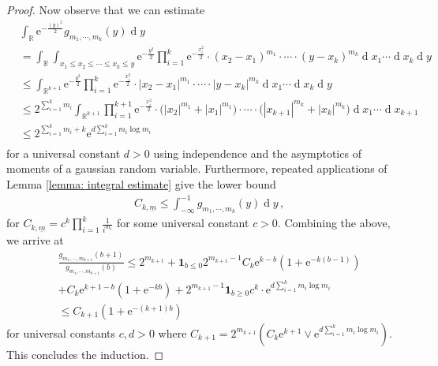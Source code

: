\documentclass[11pt, reqno]{amsart}
\numberwithin{equation}{section}
\newcommand{\R}{\ensuremath{\mathbb{R}}}
\newcommand{\diff}{\ensuremath{\operatorname{d}\!}}
\begin{document}
\begin{proof}
    Now observe that we can estimate
    \begin{equation*}
    \begin{array}{cc}
        &\displaystyle\int_{\R}\mathrm{e}^{-\frac{(y)^2}{2}} g_{m_1, \cdots, m_{k}}(y)\diff y\\
        & = \displaystyle \int_{\R}\int_{x_1\le x_2\le \cdots\le x_k\le y}\mathrm{e}^{-\frac{y^2}{2}}\prod_{i=1}^{k}\mathrm{e}^{-\frac{x_i^2}{2}}\cdot(x_2-x_1)^{m_1}\cdot \cdots \cdot (y-x_k)^{m_k}\diff x_1\cdots \diff x_{k}\diff y\\
        & \le \displaystyle \int_{\R^{k+1}}\mathrm{e}^{-\frac{y^2}{2}}\prod_{i=1}^{k}\mathrm{e}^{-\frac{x_i^2}{2}}\cdot|x_2-x_1|^{m_1}\cdot \cdots \cdot |y-x_k|^{m_k}\diff x_1\cdots \diff x_{k}\diff y\\
        & \le 2^{\sum_{i=1}^k m_i }\displaystyle \int_{\R^{k+1}}\prod_{i=1}^{k+1}\mathrm{e}^{-\frac{x_i^2}{2}}\cdot\big(|x_2|^{m_1}+|x_1|^{m_1}\big)\cdot \cdots \cdot \big(|x_{k+1}|^{m_k}+|x_k|^{m_k}\big)\diff x_1\cdots \diff x_{k+1}\\
        & \le 2^{\sum_{i=1}^k m_i + k}\mathrm{e}^{d\sum_{i=1}^k m_i\log m_i}\\
    \end{array}
    \end{equation*}
    for a universal constant $d>0$ using independence and the asymptotics of moments of a gaussian random variable. Furthermore, repeated applications of Lemma \ref{lemma: integral estimate} give the lower bound 
    \begin{equation*}
    \begin{array}{cc}
          &C_{k, \underline{m}}\le \displaystyle\int^{-1}_{-\infty}g_{m_1, \cdots, m_{k}}(y) \diff y\,,
    \end{array}
    \end{equation*}
for $C_{k, \underline{m}} = c^k\prod_{i=1}^k\frac{1}{i^{m_{i}}}$ for some universal constant $c>0$. Combining the above, we arrive at
\begin{equation*}
\begin{array}{cc}
     & \frac{g_{m_1, \cdots, m_{k+1}}(b+1)}{g_{m_1, \cdots, m_{k+1}}(b)}\le 2^{m_{k+1}} + \mathbf{1}_{b\le 0}2^{m_{k+1}-1}C_k\mathrm{e}^{k-b} (1+\mathrm{e}^{-k(b-1)})\\
     & +C_k\mathrm{e}^{k+1-b} (1+\mathrm{e}^{-kb}) + 2^{m_{k+1}-1}\mathbf{1}_{b\ge 0}c^k \cdot \mathrm{e}^{d\sum_{i=1}^k m_i\log m_i} \\
     & \le C_{k+1}(1+\mathrm{e}^{-(k+1)b})
\end{array}
\end{equation*}
    for universal constants $c,d>0$ where $C_{k+1} = 2^{m_{k+1}}(C_{k}\mathrm{e}^{k+1}\lor \mathrm{e}^{d\sum_{i=1}^k m_i\log m_i})$. This concludes the induction.
\end{proof}
\end{document}
